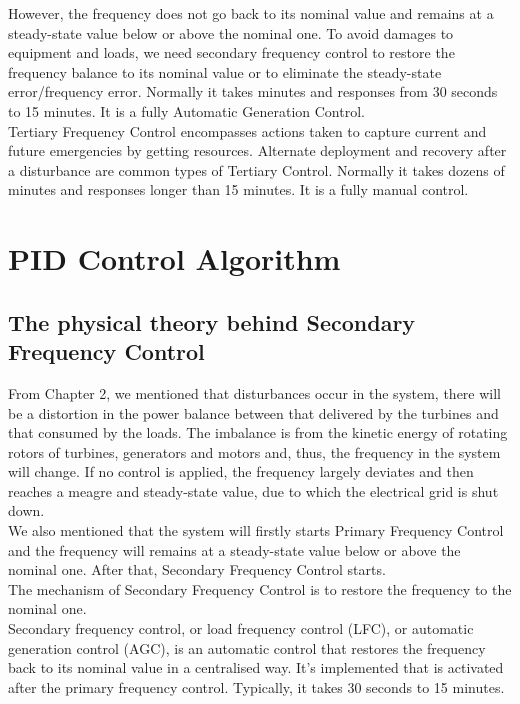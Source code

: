 \documentclass{report}
\begin{document}
However, the frequency does not go back to its nominal value and remains at a steady-state value below or above the nominal one. To avoid damages to equipment and loads, we need secondary frequency control to restore the frequency balance to its nominal value or to eliminate the steady-state error/frequency error. Normally it takes minutes and responses from 30 seconds to 15 minutes. It is a fully Automatic Generation Control.\\


Tertiary Frequency Control encompasses actions taken to capture current and future emergencies by getting resources. Alternate deployment and recovery after a disturbance are common types of Tertiary Control. Normally it takes dozens of minutes and responses longer than 15 minutes. It is a fully manual control.



\chapter{PID Control Algorithm}
\section{The physical theory behind Secondary Frequency Control}
From Chapter 2, we mentioned that disturbances occur in the system, there will be a distortion in the power balance between that delivered by the turbines and that consumed by the loads. The imbalance is from the kinetic energy of rotating rotors of turbines, generators and motors and, thus, the frequency in the system will change. If no control is applied, the frequency largely deviates and then reaches a meagre and steady-state value, due to which the electrical grid is shut down. \\

We also mentioned that the system will firstly starts Primary Frequency Control and the frequency will remains at a steady-state value below or above the nominal one. After that, Secondary Frequency Control starts.\\

The mechanism of Secondary Frequency Control is to restore the frequency to the nominal one.\\

Secondary frequency control, or load frequency control (LFC), or automatic generation control (AGC), is an automatic control that restores the frequency back to its nominal value in a centralised way. It's implemented that is activated after the primary frequency control. Typically, it takes 30 seconds to 15 minutes.\\
\end{document}
